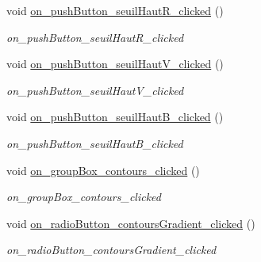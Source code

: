\begin{DoxyCompactItemize}
\mbox{\label{classAppMainWindow_a9ae74377e5e195074f3f101e911fdc77}} 
void \hyperlink{classAppMainWindow_a9ae74377e5e195074f3f101e911fdc77}{on\+\_\+push\+Button\+\_\+seuil\+Haut\+R\+\_\+clicked} ()
\begin{DoxyCompactList}\small\item\em on\+\_\+push\+Button\+\_\+seuil\+Haut\+R\+\_\+clicked \end{DoxyCompactList}\item 
\mbox{\label{classAppMainWindow_a5b525c78560d55fc6f235988eee3c9b3}} 
void \hyperlink{classAppMainWindow_a5b525c78560d55fc6f235988eee3c9b3}{on\+\_\+push\+Button\+\_\+seuil\+Haut\+V\+\_\+clicked} ()
\begin{DoxyCompactList}\small\item\em on\+\_\+push\+Button\+\_\+seuil\+Haut\+V\+\_\+clicked \end{DoxyCompactList}\item 
\mbox{\label{classAppMainWindow_aeea9ea0fbe9ea4252256ae6a679dd7c9}} 
void \hyperlink{classAppMainWindow_aeea9ea0fbe9ea4252256ae6a679dd7c9}{on\+\_\+push\+Button\+\_\+seuil\+Haut\+B\+\_\+clicked} ()
\begin{DoxyCompactList}\small\item\em on\+\_\+push\+Button\+\_\+seuil\+Haut\+B\+\_\+clicked \end{DoxyCompactList}\item 
\mbox{\label{classAppMainWindow_a657d4bc284189492b7fbe505dcc207ff}} 
void \hyperlink{classAppMainWindow_a657d4bc284189492b7fbe505dcc207ff}{on\+\_\+group\+Box\+\_\+contours\+\_\+clicked} ()
\begin{DoxyCompactList}\small\item\em on\+\_\+group\+Box\+\_\+contours\+\_\+clicked \end{DoxyCompactList}\item 
\mbox{\label{classAppMainWindow_a84157a1e5e8fac17f37c6c2806ee7795}} 
void \hyperlink{classAppMainWindow_a84157a1e5e8fac17f37c6c2806ee7795}{on\+\_\+radio\+Button\+\_\+contours\+Gradient\+\_\+clicked} ()
\begin{DoxyCompactList}\small\item\em on\+\_\+radio\+Button\+\_\+contours\+Gradient\+\_\+clicked \end{DoxyCompactList}\item 

\end{DoxyCompactItemize}
